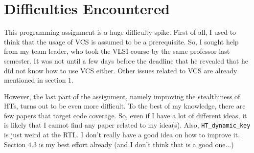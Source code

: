 \documentclass{article}
\begin{document}
\section{Difficulties Encountered}

This programming assignment is a huge difficulty spike. First of all, I used to think that the usage of VCS is assumed to be a prerequisite. So, I sought help from my team leader, who took the VLSI course by the same professor last semester. It was not until a few days before the deadline that he revealed that he did not know how to use VCS either. Other issues related to VCS are already mentioned in section 1.

However, the last part of the assignment, namely improving the stealthiness of HTs, turns out to be even more difficult. To the best of my knowledge, there are few papers that target code coverage. So, even if I have a lot of different ideas, it is likely that I cannot find any paper related to my idea(s). Also, \verb|HT_dynamic_key| is just weird at the RTL. I don't really have a good idea on how to improve it. Section 4.3 is my best effort already (and I don't think that is a good one...)

\printbibliography
\end{document}
